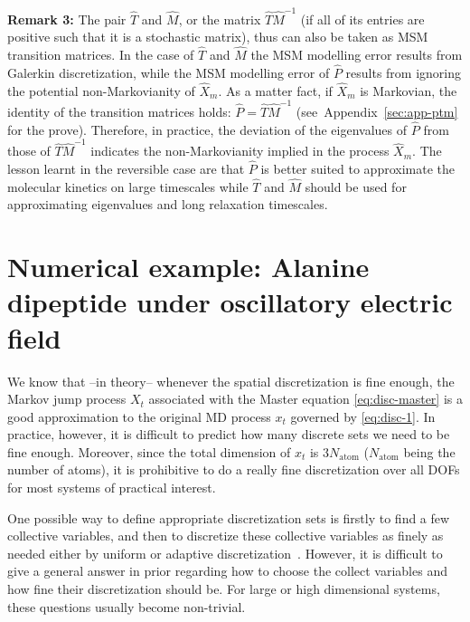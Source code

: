 \documentclass[aps, pre, preprint,unsortedaddress,a4paper,onecolumn]{revtex4}
\newcommand{\recheck}[1]{{\color{red} #1}}
\begin{document}
\textbf{Remark 3:}
The pair $\hat{T}$ and $\hat{M}$, or the matrix $\hat{T}\hat{M}^{-1}$ (if all of its entries are positive such that it is a stochastic matrix), thus can also be taken as MSM transition matrices. In the case of  $\hat{T}$ and $\hat{M}$ the MSM modelling error results from Galerkin discretization, while the MSM modelling error of $\hat{P}$ results from ignoring the potential non-Markovianity of $\hat{X}_m$.
\recheck{As a matter fact, if $\hat X_m$ is Markovian, the identity of the transition matrices holds: $\hat P = \hat T \hat M^{-1}$ (see~Appendix~\ref{sec:app-ptm} for the prove).
Therefore, in practice, the deviation of the eigenvalues of $\hat P$ from those of $\hat{T}\hat{M}^{-1}$ indicates the non-Markovianity implied in the process $\hat{X}_m$.}
The lesson learnt in the reversible case are that $\hat{P}$ is better suited to approximate the molecular kinetics on large timescales while $\hat{T}$ and $\hat{M}$ should be used for approximating eigenvalues and long relaxation timescales.





\section{Numerical example:
  Alanine dipeptide under oscillatory electric field}
\label{sec:alanine}

We know that --in theory-- whenever the spatial discretization is fine enough, the Markov jump
process $X_t$ associated with the Master equation \eqref{eq:disc-master} is a good approximation to the original
MD process $x_t$ governed by \eqref{eq:disc-1}.  In practice, however, it is difficult to predict
how many discrete sets we need to be fine enough. Moreover, since the
total dimension of $x_t$ is $3N_{\textrm{atom}}$ ($N_{\textrm{atom}}$ being the number of atoms), it is prohibitive to do a really fine discretization
over all DOFs for most systems of practical interest.

One possible way to define appropriate discretization sets is firstly to find a few collective
variables, and then to discretize these collective variables as finely as needed either by uniform or adaptive
discretization~\cite{chodera2007automatic, prinz2011markov}.
However, it is difficult to give a general answer in prior regarding
how to choose the collect variables and how fine their discretization should be.
For large or high dimensional systems, these questions usually become non-trivial. 
\end{document}
